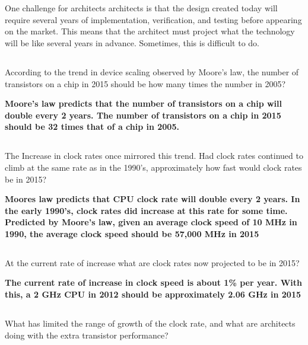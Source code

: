 \documentclass{article}
\begin{document}
\section{}

One challenge for architects architects is that the design created today will require several years of implementation, verification, and testing before appearing on the market. This means that the architect must project what the technology will be like several years in advance. Sometimes, this is difficult to do.
\begin{adjustwidth}{2.5em}{0pt}
\subsection{}
According to the trend in device scaling observed by Moore's law, the number of transistors on a chip in 2015 should be how many times the number in 2005? 

\vspace{5mm}
\textbf{Moore's law predicts that the number of transistors on a chip will double every 2 years. The number of transistors on a chip in 2015 should be 32 times that of a chip in 2005.}
\subsection{} 
The Increase in clock rates once mirrored this trend. Had clock rates continued to climb at the same rate as in the 1990's, approximately how fast would clock rates be in 2015? 
	
\vspace{5mm}
\textbf{Moores law predicts that CPU clock rate will double every 2 years. In the early 1990's, clock rates did increase at this rate for some time. Predicted by Moore's law, given an average clock speed of 10 MHz in 1990, the average clock speed should be 57,000 MHz in 2015}

\subsection{} 
At the current rate of increase what are clock rates now projected to be in 2015? 

\vspace{5mm}
\textbf{The current rate of increase in clock speed is about 1\% per year. With this, a 2 GHz CPU in 2012 should be approximately 2.06 GHz in 2015}
\subsection{} 
What has limited the range of growth of the clock rate, and what are architects doing with the extra transistor performance? 


\end{adjustwidth}
\end{document}
